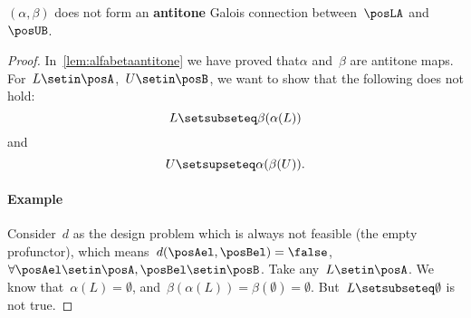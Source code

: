 
\begin{lemma}
    $(\alpha, \beta)$ does not form an \textbf{antitone}
    Galois connection between~$\posLA$ and~$\posUB$.
\end{lemma}
\begin{proof}
    In~\cref{lem:alfabetaantitone} we have proved that$\alpha$ and~$\beta$ are antitone maps.
    For~$L\setin \posA$,~$U\setin \posB$, we want to show that the following does not hold:
    \begin{equation}
        \label{eq:alfabetafirst}
        L\setsubseteq \beta(\alpha(L))
    \end{equation}
    and
    \begin{equation}
        \label{eq:alfabetasec}
        U\setsupseteq \alpha(\beta(U)).
    \end{equation}

    \paragraph{Example}
    Consider~$d$ as the design problem which is always not feasible (the empty profunctor), which means~$d(\posAel,\posBel)=\false$,~$\forall \posAel\setin \posA,\posBel\setin \posB$.
    Take any~$L\setin \posA$.
    We know that~$\alpha(L)=\emptyset$, and~$\beta(\alpha(L))=\beta(\emptyset)=\emptyset$.
    But~$L\setsubseteq \emptyset$ is not true.
\end{proof}

